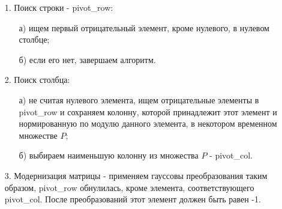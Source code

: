 \documentclass[a4paper,14pt,russian]{extreport}
\begin{document}
\begin{enumerate}
\item[1.] Поиск строки - pivot\_row:
  \begin{enumerate}
  \item[а)] ищем первый отрицательный элемент, кроме нулевого, в нулевом столбце;
  \item[б)] если его нет, завершаем алгоритм.
  \end{enumerate}
\item[2.] Поиск столбца:
  \begin{enumerate}
  \item[а)] не считая нулевого элемента, ищем отрицательные элементы в pivot\_row и сохраняем колонну, которой принадлежит этот элемент и нормированную по модулю данного элемента, в некотором временном множестве $P$;
  \item[б)] выбираем наименьшую колонну из множества $P$ - pivot\_col.
  \end{enumerate}
\item[3.] Модернизация матрицы - применяем гауссовы преобразования таким образом, pivot\_row обнулилась, кроме элемента, соответствующего pivot\_col. После преобразований этот элемент должен быть равен -1.
\end{enumerate}
\par
\end{document}
